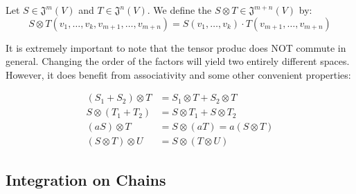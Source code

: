 \begin{definition}
    Let $S \in \mathfrak{J}^m(V)$ and $T \in \mathfrak{J}^n(V)$. We define the
     $S \otimes T \in \mathfrak{J}^{m+n}(V)$ by:
    \begin{equation*}
        S \otimes T (v_1, \hdots, v_k, v_{m+1}, \hdots, v_{m+n}) =
        S(v_1, \hdots, v_k) \cdot T(v_{m+1}, \hdots, v_{m+n})
    \end{equation*}
\end{definition}

It is extremely important to note that the tensor produc does NOT commute in general.
Changing the order of the factors will yield two entirely different spaces. However,
it does benefit from associativity and some other convenient properties:

\begin{align*}
    (S_1 + S_2) \otimes T &= S_1 \otimes T + S_2 \otimes T\\
    S \otimes (T_1 + T_2) &= S \otimes T_1 + S \otimes T_2\\
    (aS) \otimes T &= S \otimes (aT) = a(S \otimes T)\\
    (S \otimes T) \otimes U &= S \otimes (T \otimes U)
\end{align*}


\subsection{Integration on Chains}